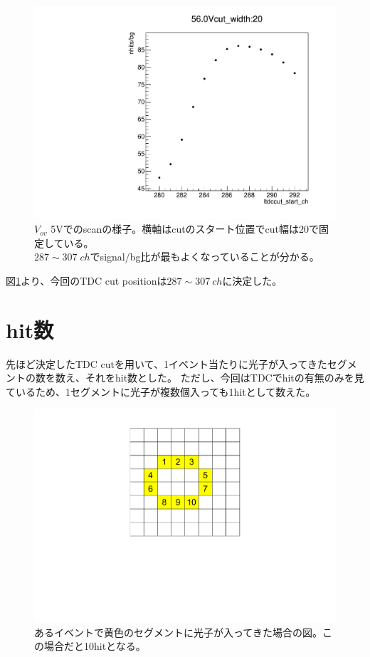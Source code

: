\documentclass[uplatex, titlepage, dvipdfmx, 12pt, a4paper]{jsreport}
\begin{document}
  \begin{figure}[bthp]
    \begin{center} 
      \includegraphics[clip, scale=0.25]{image/TDCcut_scan.pdf}
      \caption{$V_{ov}$ 5\si{V}でのscanの様子。横軸はcutのスタート位置でcut幅は20で固定している。\\ $287\sim 307\;\si{ch}$でsignal/bg比が最もよくなっていることが分かる。}
      \label{fig:tdc_scan} 
    \end{center}
  \end{figure}
  図\ref{fig:tdc_scan}より、今回のTDC cut positionは$287 \sim 307 \:\si{ch}$に決定した。

  \section{hit数}
    先ほど決定したTDC cutを用いて、1イベント当たりに光子が入ってきたセグメントの数を数え、それをhit数とした。
    ただし、今回はTDCでhitの有無のみを見ているため、1セグメントに光子が複数個入っても1hitとして数えた。
    \begin{figure}[hbtp]
      \begin{center} 
        \includegraphics[scale=0.4, clip]{image/hit_image.pdf}
        \caption{あるイベントで黄色のセグメントに光子が入ってきた場合の図。この場合だと10hitとなる。} 
        \label{fig:hit_image} 
      \end{center}
    \end{figure}
    
\end{document}
